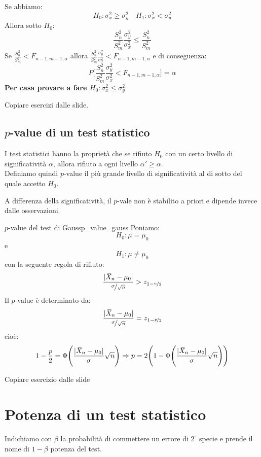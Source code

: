 \documentclass[12pt]{report}
\newcounter{exercise}
\newcommand{\wbar}[1]{%
	\accentset{\mbox{\rule{0.55em}{0.5pt}}}{#1}%
}
\begin{document}
		Se abbiamo:
		\[
		H_0: \sigma_x^2 \geq \sigma_y^2 \quad H_1: \sigma_x^2 < \sigma_y^2
		\]
		Allora sotto $H_0$:
		\[
		\frac{S_n^2}{S_m^2}\frac{\sigma_y^2}{\sigma_x^2} \leq \frac{S_n^2}{S_m^2}
		\]
		Se $\frac{S_n^2}{S_m^2} < F_{n-1, m-1, \alpha}$ allora $\frac{S_n^2}{S_m^2}\frac{\sigma_y^2}{\sigma_x^2} < F_{n-1, m-1, \alpha}$ e di conseguenza:
		\[
		P\Bigg[\frac{S_n^2}{S_m^2}\frac{\sigma_y^2}{\sigma_x^2} < F_{n-1, m-1, \alpha}\Bigg] = \alpha
		\]
		\textbf{Per casa provare a fare $H_0: \sigma_x^2 \leq \sigma_y^2$}
		\begin{exercise}{}{}
		Copiare esercizi dalle slide.
		\end{exercise}
		\subsection{$p$-value di un test statistico}
		I test statistici hanno la proprietà che se rifiuto $H_0$ con un certo livello di significatività $\alpha$, allora rifiuto a ogni livello $\alpha' \geq \alpha$. \\
		Definiamo quindi $p$-value il più grande livello di significatività al di sotto del quale accetto $H_0$.
		\begin{note}{}{}
			A differenza della significatività, il $p$-vale non è stabilito a priori e dipende invece dalle osservazioni.
		\end{note}
		\begin{example}{$p$-value del test di Gauss}{p_value_gauss}
		Poniamo:
		\[
		H_0: \mu = \mu_0
		\]
		e
		\[
		H_1: \mu \neq \mu_0
		\]
		con la seguente regola di rifiuto:
		\[
		\frac{|\wbar{X}_n - \mu_0|}{\nicefrac{\sigma}{\sqrt{n}}} > z_{1 - \nicefrac{\alpha}{2}}
		\]
		Il $p$-value è determinato da:
		\[
		\frac{|\wbar{X}_n - \mu_0|}{\nicefrac{\sigma}{\sqrt{n}}} = z_{1 - \nicefrac{p}{2}}
		\]
		cioè:
		\[
		1 - \frac{p}{2} = \Phi\Bigg(\frac{|\wbar{X}_n - \mu_0|}{\sigma}\sqrt{n}\Bigg) \Rightarrow p = 2\Bigg(1 - \Phi\Bigg(\frac{|\wbar{X}_n - \mu_0|}{\sigma}\sqrt{n}\Bigg)\Bigg)
		\]
		\end{example}
		\begin{exercise}{}{}
		Copiare esercizio dalle slide
		\end{exercise}
		\section{Potenza di un test statistico}
		Indichiamo con $\beta$ la probabilità di commettere un errore di $2^\circ$ specie e prende il nome di $1 - \beta$ potenza del test. \\
\end{document}
